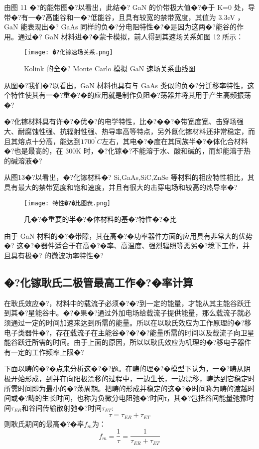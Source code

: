 \documentclass{zjureport}
\begin{document}
由图 11 �?的能带图�?以看出，此结�? GaN 的价带极大值�?�于 K=0 处，导带�?有一�?高能谷和一�?低能谷，且具有较宽的禁带宽度，其值为 3.3eV ，GaN 能表现出�? GaAs 同样的负�?分电阻特性�?�是因为这两�?能谷的作用。通过�? GaN 材料进�?�蒙卡模拟，前人得到其速场关系如图 12 所示：
\begin{figure}[htbp]
	\centering
	\texttt{[image: �?化镓速场关系.png]}
	\caption{Kolink 的全�? Monte Carlo 模拟 GaN 速场关系曲线图}
\end{figure}

从图�?我们�?以看出，GaN 材料也具有与 GaAs 类似的负�?分迁移率特性，这个特性使其有一�?重�?�的应用就是制作负阻�?荡器并将其用于产生高频振荡�?

�?化镓材料具有许�?�优�?的电学特性，比�?��?�带宽度宽、击穿场强大、耐腐蚀性强、抗辐射性强、热导率高等特点，另外氮化镓材料还非常稳定，而且其熔点十分高，能达到$1700^{°}C$左右，其电�?�度在其同族半�?�体化合材料�?也是最高的，在 300K 时，�?化镓�?不能溶于水、酸和碱的，而却能溶于热的碱溶液�?

从图13�?以看出，�?化镓材料�? Si,GaAs,SiC,ZnSe 等材料的相应特性相比，其具有最大的禁带宽度和饱和速度，并且有很大的击穿电场和较高的热导率�?
\begin{figure}[htbp]
	\centering
	\texttt{[image: 特性�?�比图表.png]}
	\caption{几�?�重要的半�?�体材料的基�?特性�?�比}
\end{figure}

由于 GaN 材料的�?�带隙，其在高�?�功率器件方面的应用具有非常大的优势�?
这�?�器件适合于在高�?�率、高温度、强烈辐照等恶劣�?境下工作，并且具有极�?
的微波功率特性�?

\subsection{�?化镓耿氏二极管最高工作�?�率计算}

在耿氏效应�?，材料中的载流子必须�?�?到一定的能量，才能从其主能谷跃迁到其�?星能谷中。�?�果�?通过外加电场给载流子提供能量，那么载流子就必须通过一定的时间加速来达到所需的能量。所以在以耿氏效应为工作原理的�?移电子类器件�?，存在载流子在主能谷�?�?�?能量所需的时间以及载流子向卫星能谷跃迁所需的时间。由于上面的原因，所以以耿氏效应为机理的�?移电子器件有一定的工作频率上限�?

下面以畴的�?�点来分析这�?�?题。在畴的理�?�模型下认为，一�?畴从阴极开始形成，到并在向阳极漂移的过程中，一边生长，一边漂移，畴达到它稳定时所需时间即为最小的�?荡周期。把畴的形成并稳定的这�?�时间称为畴的渡越时间或�?畴的生长时间，也称为负微分电阻弛�?时间τ，其�?包括谷间能量弛豫时间$\tau_{ER}$和谷间传输散射弛�?时间$\tau_{ET}$:
\begin{equation}
	\tau=\tau_{ER}+\tau_{ET}
\end{equation}
则耿氏期间的最高�?�率$f_{m}$为：
\begin{equation}
	f_{m}=\frac{1}{\tau}=\frac{1}{\tau_{ER}+\tau_{ET}}
\end{equation}
\end{document}
